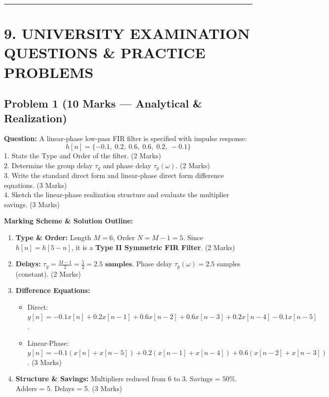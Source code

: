 \documentclass[11pt,a4paper]{article}
\begin{document}
\noindent\rule{\textwidth}{0.5pt}

\section{9. UNIVERSITY EXAMINATION QUESTIONS \& PRACTICE PROBLEMS}

\subsection{Problem 1 (10 Marks — Analytical \& Realization)}
\textbf{Question:} 
A linear-phase low-pass FIR filter is specified with impulse response:
\begin{equation}
h[n] = \{ -0.1, \; 0.2, \; 0.6, \; 0.6, \; 0.2, \; -0.1 \}
\end{equation}
1. State the Type and Order of the filter. (2 Marks) \\
2. Determine the group delay $\tau_g$ and phase delay $\tau_p(\omega)$. (2 Marks) \\
3. Write the standard direct form and linear-phase direct form difference equations. (3 Marks) \\
4. Sketch the linear-phase realization structure and evaluate the multiplier savings. (3 Marks)

\vspace{0.2cm}
\noindent\textbf{Marking Scheme \& Solution Outline:}
\begin{enumerate}
    \item \textbf{Type \& Order:} Length $M = 6$, Order $N = M-1 = 5$. Since $h[n] = h[5-n]$, it is a \textbf{Type II Symmetric FIR Filter}. (2 Marks)
    \item \textbf{Delays:} $\tau_g = \frac{M-1}{2} = \frac{5}{2} = \mathbf{2.5 \text{ samples}}$. Phase delay $\tau_p(\omega) = 2.5$ samples (constant). (2 Marks)
    \item \textbf{Difference Equations:}
    \begin{itemize}
        \item Direct: $y[n] = -0.1x[n] + 0.2x[n-1] + 0.6x[n-2] + 0.6x[n-3] + 0.2x[n-4] - 0.1x[n-5]$.
        \item Linear-Phase: $y[n] = -0.1(x[n]+x[n-5]) + 0.2(x[n-1]+x[n-4]) + 0.6(x[n-2]+x[n-3])$. (3 Marks)
    \end{itemize}
    \item \textbf{Structure \& Savings:} Multipliers reduced from 6 to 3. Savings = $50\%$. Adders = 5. Delays = 5. (3 Marks)
\end{enumerate}
\end{document}
